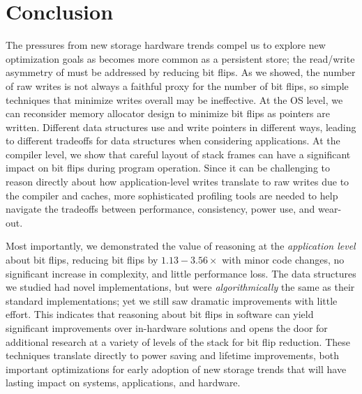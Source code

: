 \section{Conclusion}
\label{sec:conclusion}

The pressures from new storage hardware trends compel us to explore new optimization goals as \NVM
becomes more common as a persistent store; the read/write asymmetry of \NVM must be addressed by
reducing bit flips.
As we showed, the
number of raw writes is not always a faithful proxy for the number of bit flips,
so simple techniques that minimize writes overall may be ineffective.
At the OS level, we can reconsider memory allocator design to
minimize bit flips as pointers are written. Different data structures use and
write pointers in different ways, leading to different tradeoffs for data
structures when considering \NVM applications. At the compiler level, we show
that careful layout of stack frames can have a significant impact on bit flips
during program operation. Since it can be challenging to reason directly about
how application-level writes translate to raw writes due to the compiler and
caches, more sophisticated profiling tools are needed to help navigate the
tradeoffs between performance, consistency, power use, and wear-out.

Most importantly, we demonstrated the value of reasoning at the \emph{application level} about bit
flips, reducing bit flips by $1.13-3.56\times$ with minor code changes, no significant increase in
complexity, and little performance loss. The data structures we studied had novel implementations,
but were \textit{algorithmically} the same as their standard implementations; yet we still saw
dramatic improvements with little effort. This indicates that reasoning about bit flips in software
can yield significant improvements over in-hardware solutions and opens the door for additional
research at a variety of levels of the stack for bit flip reduction.  These techniques translate
directly to power saving and lifetime improvements, both important optimizations for early adoption
of new storage trends that will have lasting impact on systems, applications, and hardware.



